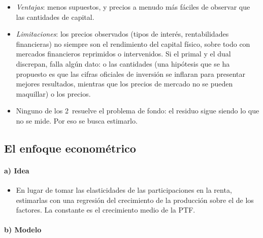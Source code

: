 \documentclass[11pt]{article}
\begin{document}
\begin{itemize}
\item \emph{Ventajas}: menos supuestos, y precios a menudo más fáciles de observar que las cantidades de capital.
\item \emph{Limitaciones}: los precios observados (tipos de interés, rentabilidades financieras) no siempre son el rendimiento del capital físico, sobre todo con mercados financieros reprimidos o intervenidos. Si el primal y el dual discrepan, falla algún dato: o las cantidades (una hipótesis que se ha propuesto es que las cifras oficiales de inversión se inflaran para presentar mejores resultados, mientras que los precios de mercado no se pueden maquillar) o los precios.
\item Ninguno de los 2~resuelve el problema de fondo: el residuo sigue siendo lo que no se mide. Por eso se busca estimarlo.
\end{itemize}
\subsection{El enfoque econométrico}\label{sec:econometrico}

\paragraph{a) Idea}

\begin{itemize}
\item En lugar de tomar las elasticidades de las participaciones en la renta, estimarlas con una regresión del crecimiento de la producción sobre el de los factores. La constante es el crecimiento medio de la PTF.
\end{itemize}

\paragraph{b) Modelo}
\end{document}
